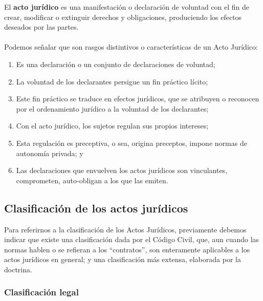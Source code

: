 \documentclass{templateNote}
\begin{document}
El \textbf{acto jurídico} es una manifestación o declaración de voluntad con el fin de crear, modificar o extinguir derechos y obligaciones, produciendo los efectos deseados por las partes.
\\\\
\noindent Podemos señalar que son rasgos distintivos o características de un Acto Jurídico:
\begin{enumerate}[label=\alph*)]
    \item Es una declaración o un conjunto de declaraciones de voluntad;
    \item La voluntad de los declarantes persigue un fin práctico lícito;
    \item Este fin práctico se traduce en efectos jurídicos, que se atribuyen o reconocen por el ordenamiento jurídico a la voluntad de los declarantes;
    \item Con el acto jurídico, los sujetos regulan sus propios intereses;
    \item Esta regulación es preceptiva, o sea, origina preceptos, impone normas de autonomía privada; y
    \item Las declaraciones que envuelven los actos jurídicos son vinculantes, comprometen, auto-obligan a los que las emiten.
\end{enumerate}

\subsection{Clasificación de los actos jurídicos}
Para referirnos a la clasificación de los Actos Jurídicos, previamente debemos indicar que existe una clasificación dada por el Código Civil, que, aun cuando las normas hablen o se refieran a los “contratos”, son enteramente aplicables a los actos jurídicos en general; y una clasificación más extensa, elaborada por la doctrina.

\subsubsection{Clasificación legal}
\end{document}
